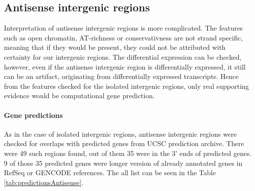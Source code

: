 \subsection{Antisense intergenic regions}

Interpretation of antisense intergenic regions is more complicated.
The features such as open chromatin, AT-richness or conservativness are not strand specific,
meaning that if they would be present, they could not be attributed with certainty for our intergenic regions.
The differential expression can be checked, however, even if the antisense intergenic region is differentially expressed,
it still can be an artifact, originating from differentially expressed transcripts.
Hence from the features checked for the isolated intergenic regions, only real supporting evidence would be computational gene prediction.

\paragraph{Gene predictions}

As in the case of isolated intergenic regions,
antisense intergenic regions were checked for overlaps with predicted genes from UCSC prediction archive.
There were 49 such regions found, out of them 35 were in the 3' ends of predicted genes.
9 of those 35 predicted genes were longer version of already annotated genes in RefSeq or GENCODE references.
The all list can be seen in the Table \ref{tab:predictionsAntisense}.

